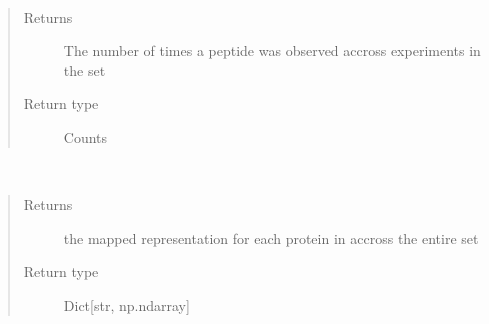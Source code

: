 \documentclass[letterpaper,10pt,english]{sphinxmanual}
\begin{document}
\begin{fulllineitems}
\begin{fulllineitems}
\begin{quote}
\begin{description}
\end{description}\end{quote}

\end{fulllineitems}


\begin{fulllineitems}
\label{\detokenize{IPTK.Classes:IPTK.Classes.ExperimentalSet.ExperimentSet.compute_peptide_representation_count}}~\begin{quote}\begin{description}
\item[{Returns}] \leavevmode
The number of times a peptide was observed accross  experiments in the set

\item[{Return type}] \leavevmode
Counts

\end{description}\end{quote}

\end{fulllineitems}


\begin{fulllineitems}
\label{\detokenize{IPTK.Classes:IPTK.Classes.ExperimentalSet.ExperimentSet.compute_protein_coverage_over_the_set}}~\begin{quote}\begin{description}
\item[{Returns}] \leavevmode
the mapped representation for each protein in accross the entire  set

\item[{Return type}] \leavevmode
Dict{[}str, np.ndarray{]}


\end{description}
\end{quote}
\end{fulllineitems}
\end{fulllineitems}
\end{document}
